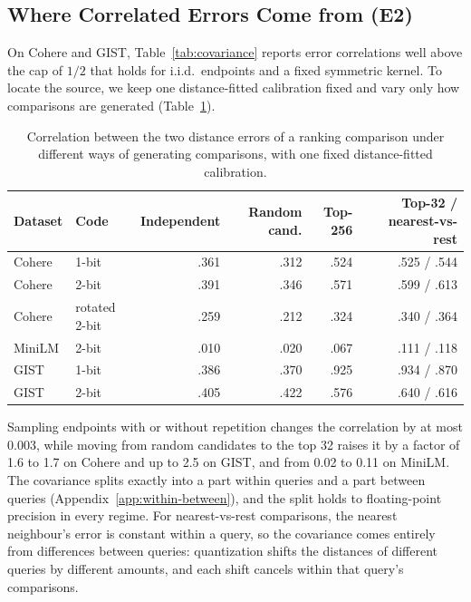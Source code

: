 \documentclass[twoside,11pt]{article}
\begin{document}
\subsection{Where Correlated Errors Come from (E2)}
\label{sec:exp-covariance}

On Cohere and GIST, Table~\ref{tab:covariance} reports error correlations well above the cap of $1/2$ that holds for i.i.d.\ endpoints and a fixed symmetric kernel. To locate the source, we keep one distance-fitted calibration fixed and vary only how comparisons are generated (Table~\ref{tab:selection-covariance}).

\begin{table}[tbp]
\centering


\setlength{\tabcolsep}{4pt}
\begin{tabular}{llrrrr}
\toprule
Dataset & Code & Independent & Random cand. & Top-256 & Top-32 / nearest-vs-rest \\
\midrule
Cohere & 1-bit & .361 & .312 & .524 & .525 / .544 \\
Cohere & 2-bit & .391 & .346 & .571 & .599 / .613 \\
Cohere & rotated 2-bit & .259 & .212 & .324 & .340 / .364 \\
MiniLM & 2-bit & .010 & .020 & .067 & .111 / .118 \\
GIST & 1-bit & .386 & .370 & .925 & .934 / .870 \\
GIST & 2-bit & .405 & .422 & .576 & .640 / .616 \\
\bottomrule
\end{tabular}

\small
\caption{Correlation between the two distance errors of a ranking comparison under different ways of generating comparisons, with one fixed distance-fitted calibration.}
\label{tab:selection-covariance}
\end{table}

Sampling endpoints with or without repetition changes the correlation by at most 0.003, while moving from random candidates to the top 32 raises it by a factor of 1.6 to 1.7 on Cohere and up to 2.5 on GIST, and from 0.02 to 0.11 on MiniLM. The covariance splits exactly into a part within queries and a part between queries (Appendix~\ref{app:within-between}), and the split holds to floating-point precision in every regime. For nearest-vs-rest comparisons, the nearest neighbour's error is constant within a query, so the covariance comes entirely from differences between queries: quantization shifts the distances of different queries by different amounts, and each shift cancels within that query's comparisons.
\end{document}
